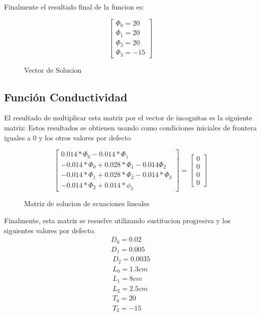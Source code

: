 \documentclass{article}
\begin{document}
Finalmente el resultado final de la funcion es:

\begin{figure}[!h]
    
    \[
        \begin{bmatrix}
            {\Phi_0 = 20}\\
            {\Phi_1 = 20}\\
            {\Phi_2 = 20}\\
            {\Phi_3 = -15}
        \end{bmatrix}
    \]
    \caption{Vector de Solucion}
\end{figure}

\subsection{Función Conductividad}

El resultado de multiplicar esta matriz por el vector de incognitas es la siguiente matriz:
Estos resultados se obtienen usando como condiciones iniciales de frontera iguales a 0 y los otros valores por defecto
\begin{figure}[!h]
    \[
        \begin{bmatrix}
            {0.014*\Phi_0 - 0.014*\Phi_1}\\
            {-0.014*\Phi_0 + 0.028*\Phi_1-0.014\Phi_2}\\
            {-0.014*\Phi_1 + 0.028*\Phi_2 - 0.014*\Phi_3}\\
            {-0.014*\Phi_2 + 0.014*\phi_3}
        \end{bmatrix}
        =
        \begin{bmatrix}
            {0}\\
            {0}\\
            {0}\\
            {0}
        \end{bmatrix}
    \]
    \caption{Matriz de solucion de ecuaciones lineales}
    \end{figure}
Finalmente, esta matriz se resuelve utilizando sustitucion progresiva y los siguientes valores por defecto.
\begin{gather}
        D_0 = 0.02\\
        D_1 = 0.005\\\
        D_2 = 0.0035\\\
        L_0 = 1.3cm\\\
        L_1 = 8cm\\\
        L_2 = 2.5cm\\\
        T_0 = 20\\\
        T_2 = -15
\end{gather}
\end{document}
